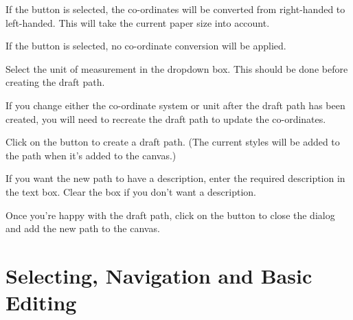 
If the  button is selected,
the \glspl{co-ordinate} will be converted from right-handed to
left-handed. This will take the current paper size into account.


If the  button is selected,
no \gls{co-ordinate} conversion will be applied.


Select the unit of measurement in the  
\gls{dropdown} box. This should be done before creating the draft
path.

\begin{important}
If you change either the \gls{co-ordinate} system
or unit after the draft path has been created, you will need to recreate the
draft path to update the \glspl{co-ordinate}.
\end{important}


Click on the  button to create a draft path. (The current
styles will be added to the path when it's added to the canvas.)


If you want the new path to have a description, enter the required 
description in the  text box.
Clear the box if you don't want a description.

Once you're happy with the draft path, click on the 
button to close the dialog and add the new \gls{path} to the \gls{canvas}.

\chapter{Selecting, Navigation and Basic Editing}\label{sec:selectobjects}


